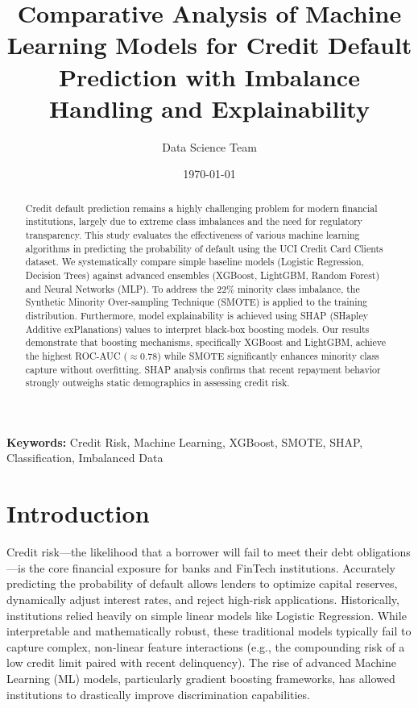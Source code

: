 \documentclass[12pt,a4paper]{article}
\title{Comparative Analysis of Machine Learning Models for Credit Default Prediction with Imbalance Handling and Explainability}
\author{Data Science Team}
\date{\today}
\begin{document}
\maketitle

\begin{abstract}
Credit default prediction remains a highly challenging problem for modern financial institutions, largely due to extreme class imbalances and the need for regulatory transparency. This study evaluates the effectiveness of various machine learning algorithms in predicting the probability of default using the UCI Credit Card Clients dataset. We systematically compare simple baseline models (Logistic Regression, Decision Trees) against advanced ensembles (XGBoost, LightGBM, Random Forest) and Neural Networks (MLP). To address the 22\% minority class imbalance, the Synthetic Minority Over-sampling Technique (SMOTE) is applied to the training distribution. Furthermore, model explainability is achieved using SHAP (SHapley Additive exPlanations) values to interpret black-box boosting models. Our results demonstrate that boosting mechanisms, specifically XGBoost and LightGBM, achieve the highest ROC-AUC ($\approx 0.78$) while SMOTE significantly enhances minority class capture without overfitting. SHAP analysis confirms that recent repayment behavior strongly outweighs static demographics in assessing credit risk.
\end{abstract}

\textbf{Keywords:} Credit Risk, Machine Learning, XGBoost, SMOTE, SHAP, Classification, Imbalanced Data

\section{Introduction}
Credit risk—the likelihood that a borrower will fail to meet their debt obligations—is the core financial exposure for banks and FinTech institutions. Accurately predicting the probability of default allows lenders to optimize capital reserves, dynamically adjust interest rates, and reject high-risk applications. Historically, institutions relied heavily on simple linear models like Logistic Regression. While interpretable and mathematically robust, these traditional models typically fail to capture complex, non-linear feature interactions (e.g., the compounding risk of a low credit limit paired with recent delinquency). The rise of advanced Machine Learning (ML) models, particularly gradient boosting frameworks, has allowed institutions to drastically improve discrimination capabilities.
\end{document}
